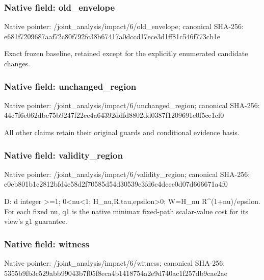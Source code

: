 \documentclass[10pt,a4paper]{article}
\begin{document}
\subsubsection{Native field: old\_\allowbreak{}envelope}
Native pointer: /joint\_\allowbreak{}analysis/impact/6/old\_\allowbreak{}envelope; canonical SHA-256: e681f7209687aaf72c80f792fc38b67417a0dccd17ece3d1ff81c546f773cb1e

\begingroup\raggedright\sloppy Exact frozen baseline,\allowbreak{} retained except for the explicitly enumerated candidate changes.\par\endgroup

\subsubsection{Native field: unchanged\_\allowbreak{}region}
Native pointer: /joint\_\allowbreak{}analysis/impact/6/unchanged\_\allowbreak{}region; canonical SHA-256: 44c7f6e062dbc75b9247f22ce4a64392ddfd8802dd0387f1209691e0f5ce1cf0

\begingroup\raggedright\sloppy All other claims retain their original guards and conditional evidence basis.\par\endgroup

\subsubsection{Native field: validity\_\allowbreak{}region}
Native pointer: /joint\_\allowbreak{}analysis/impact/6/validity\_\allowbreak{}region; canonical SHA-256: e0eb801b1c2812bfd4e58d2f70585d54d30539e3fd6c4dcee0d07d666671a4f0

\begingroup\raggedright\sloppy D:\allowbreak{} d integer >=\allowbreak{}1;\allowbreak{} 0<nu<1;\allowbreak{} H\_\allowbreak{}nu,\allowbreak{}R,\allowbreak{}tau,\allowbreak{}epsilon>0;\allowbreak{} W=\allowbreak{}H\_\allowbreak{}nu R\textasciicircum{}(1+nu)/\allowbreak{}epsilon. For each fixed nu,\allowbreak{} q1 is the native minimax fixed-path scalar-value cost for its view's g1 guarantee.\par\endgroup

\subsubsection{Native field: witness}
Native pointer: /joint\_\allowbreak{}analysis/impact/6/witness; canonical SHA-256: 5355b9fb3c529abb99043b7f05f8eca4b1418754a2e9d740ac1f257db9cae2ae
\end{document}
